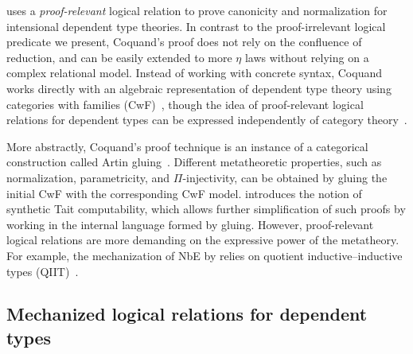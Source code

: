 \documentclass[\ifpublic nolinenum\else\fi,online,OA]{jfp}
\theoremstyle{definition}
\begin{document}
\citet{coquand:canonicity,coquand:prop} uses a \emph{proof-relevant} logical
relation to prove canonicity and normalization for intensional
dependent type theories. In contrast to the proof-irrelevant logical predicate
we present, Coquand's proof does not rely on the confluence of reduction,
and can be easily extended to more $\eta$ laws without relying on a
complex relational model. Instead of working with concrete syntax,
Coquand works directly with an algebraic representation of dependent
type theory using categories with families (CwF)~\citep{hofmann:cwf},
though the idea of proof-relevant logical relations for dependent
types can be expressed independently of category
theory~\citep{barras2012semantical}.

More abstractly, Coquand's proof technique is an instance of a categorical
construction called Artin gluing~\citep{kaposi:gluing}. Different
metatheoretic properties, such as normalization, parametricity, and
$\Pi$-injectivity, can be obtained by gluing the initial CwF with the
corresponding CwF model. \citet{sterling:tait} introduces the notion of
synthetic Tait computability, which allows further
simplification of such proofs by working in the internal language
formed by gluing.
However, proof-relevant logical relations are more demanding on the
expressive power of the metatheory. For example, the mechanization of
NbE by \citet{altenkirch:normalisation} relies on quotient
inductive--inductive types (QIIT)~\citep{kaposi:qiit}.


\subsection{Mechanized logical relations for dependent types}
\end{document}
